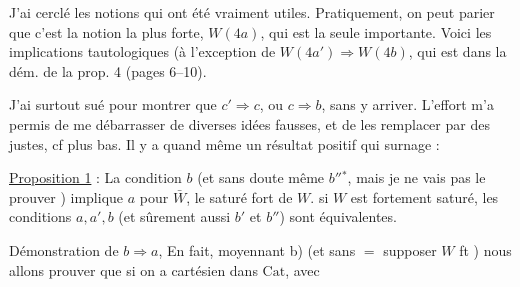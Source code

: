 J'ai cerclé les notions qui ont été vraiment utiles. Pratiquement, on peut parier que c'est la notion la plus forte, $W(4a)$, qui est la seule importante.
Voici les implications tautologiques (à l'exception de $W(4a')\Longrightarrow W(4b)$, qui est   dans la dém. de la prop. 4 (pages 6–10).

J'ai surtout sué pour montrer que $c'\Rightarrow c$, ou $c\Longrightarrow b$, sans y arriver. L'effort m'a permis de me débarrasser de diverses idées fausses, et de les remplacer par des justes, cf plus bas. Il y a quand même un résultat positif qui surnage :

\uline{Proposition 1} : La condition $b$ (et sans doute même $b''{}^*$, mais je ne vais pas le prouver \unsure{\ldots}) implique  $a$ pour $\bar W$, le saturé fort de $W$.   si $W$ est fortement saturé, les conditions $a,a',b$ (et sûrement aussi $b'$ et $b''$) sont équivalentes.

Démonstration de $b\Longrightarrow a$,    En fait, moyennant b) (et sans $=$ supposer $W$ ft ) nous allons prouver que si on a
cartésien dans $\mathrm{Cat}$, avec
